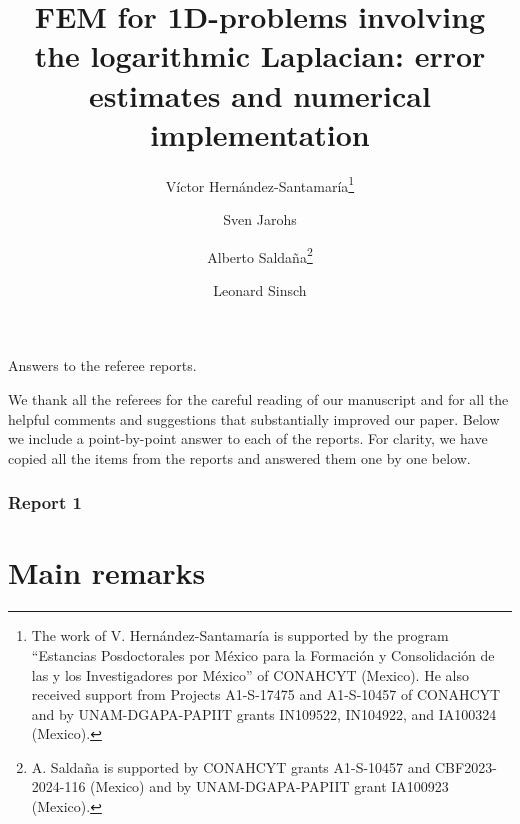 \documentclass[11 pt]{article}
\title{FEM for 1D-problems involving the logarithmic Laplacian: error estimates and numerical implementation}
\author{V\'ictor Hern\'andez-Santamar\'ia\footnote{The work of V. Hern\'andez-Santamar\'ia is supported by the program ``Estancias Posdoctorales por México para la Formación y Consolidación de las y los Investigadores por México'' of CONAHCYT (Mexico). He also received support from Projects A1-S-17475 and A1-S-10457 of CONAHCYT and by UNAM-DGAPA-PAPIIT grants IN109522, IN104922, and IA100324 (Mexico).} \and
 Sven Jarohs
 \and
Alberto Salda\~{n}a\footnote{ A. Saldaña is supported  by  
CONAHCYT grants A1-S-10457 and  CBF2023-2024-116 (Mexico) and by UNAM-DGAPA-PAPIIT grant IA100923 (Mexico).}\and
Leonard Sinsch
}
\date{}
\numberwithin{equation}{section}
\begin{document}
\begin{center}
 Answers to the referee reports.
\end{center}

We thank all the referees for the careful reading of our manuscript and for all the helpful comments and suggestions that substantially improved our paper. Below we include a point-by-point answer to each of the reports.  For clarity, we have copied all the items from the reports and answered them one by one below.


\subsubsection*{Report 1}


\section*{Main remarks}
\end{document}
